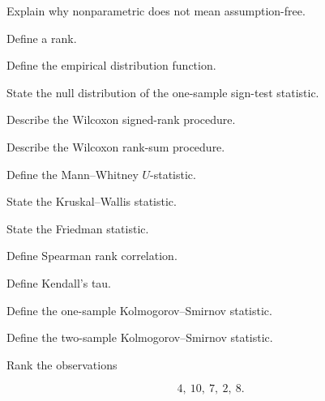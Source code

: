 \begin{exercise}[1]
Explain why nonparametric does not mean assumption-free.
\end{exercise}

\begin{exercise}[1]
Define a rank.
\end{exercise}

\begin{exercise}[1]
Define the empirical distribution function.
\end{exercise}

\begin{exercise}[1]
State the null distribution of the one-sample sign-test statistic.
\end{exercise}

\begin{exercise}[1]
Describe the Wilcoxon signed-rank procedure.
\end{exercise}

\begin{exercise}[1]
Describe the Wilcoxon rank-sum procedure.
\end{exercise}

\begin{exercise}[1]
Define the Mann--Whitney \(U\)-statistic.
\end{exercise}

\begin{exercise}[1]
State the Kruskal--Wallis statistic.
\end{exercise}

\begin{exercise}[1]
State the Friedman statistic.
\end{exercise}

\begin{exercise}[1]
Define Spearman rank correlation.
\end{exercise}

\begin{exercise}[1]
Define Kendall's tau.
\end{exercise}

\begin{exercise}[1]
Define the one-sample Kolmogorov--Smirnov statistic.
\end{exercise}

\begin{exercise}[1]
Define the two-sample Kolmogorov--Smirnov statistic.
\end{exercise}

\begin{exercise}[2]
Rank the observations

\[
4,\ 10,\ 7,\ 2,\ 8.
\]
\end{exercise}

